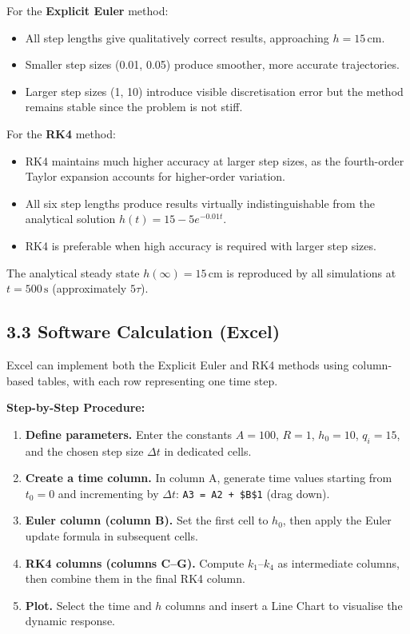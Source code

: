 \documentclass[12pt,a4paper]{article}
\begin{document}
For the \textbf{Explicit Euler} method:
\begin{itemize}
  \item All step lengths give qualitatively correct results, approaching $h = 15\,\text{cm}$.
  \item Smaller step sizes (0.01, 0.05) produce smoother, more accurate trajectories.
  \item Larger step sizes (1, 10) introduce visible discretisation error but the method
        remains stable since the problem is not stiff.
\end{itemize}

For the \textbf{RK4} method:
\begin{itemize}
  \item RK4 maintains much higher accuracy at larger step sizes, as the fourth-order
        Taylor expansion accounts for higher-order variation.
  \item All six step lengths produce results virtually indistinguishable from the
        analytical solution $h(t) = 15 - 5e^{-0.01t}$.
  \item RK4 is preferable when high accuracy is required with larger step sizes.
\end{itemize}

The analytical steady state $h(\infty) = 15\,\text{cm}$ is reproduced by all simulations at $t = 500\,\text{s}$
(approximately $5\tau$).

\subsection{3.3 Software Calculation (Excel)}

Excel can implement both the Explicit Euler and RK4 methods using column-based tables,
with each row representing one time step.

\textbf{Step-by-Step Procedure:}
\begin{enumerate}
  \item \textbf{Define parameters.} Enter the constants $A = 100$, $R = 1$, $h_0 = 10$,
        $q_i = 15$, and the chosen step size $\Delta t$ in dedicated cells.
  \item \textbf{Create a time column.} In column A, generate time values starting from
        $t_0 = 0$ and incrementing by $\Delta t$: \texttt{A3 = A2 + \$B\$1} (drag down).
  \item \textbf{Euler column (column B).} Set the first cell to $h_0$, then apply the
        Euler update formula in subsequent cells.
  \item \textbf{RK4 columns (columns C--G).} Compute $k_1$--$k_4$ as intermediate columns,
        then combine them in the final RK4 column.
  \item \textbf{Plot.} Select the time and $h$ columns and insert a Line Chart to
        visualise the dynamic response.
\end{enumerate}
\end{document}
